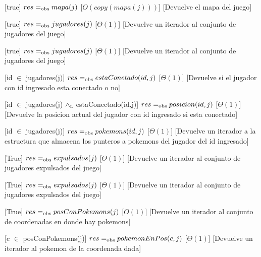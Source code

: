 \begin{Interfaz}
  [true]
  {$res =_{\mathrm{obs}} mapa(j)$}
  [$O(copy(mapa(j)))$]
  [Devuelve el mapa del juego]

  [true]
  {$res =_{\mathrm{obs}} jugadores(j)$}
  [$\Theta(1)$]
  [Devuelve un iterador al conjunto de jugadores del juego]

  [true]
  {$res =_{\mathrm{obs}} jugadores(j)$}
  [$\Theta(1)$]
  [Devuelve un iterador al conjunto de jugadores del juego]

  [id $\in$ jugadores(j)]
  {$res =_{\mathrm{obs}} estaConetado(id,j)$}
  [$\Theta(1)$]
  [Devuelve si el jugador con id ingresado esta conectado o no]

  [id $\in$ jugadores(j) $\land_{\mathrm{\scriptscriptstyle{L}}}$ estaConectado(id,j)]
  {$res =_{\mathrm{obs}} posicion(id,j)$}
  [$\Theta(1)$]
  [Devuelve la posicion actual del jugador con id ingresado si esta conectado]

  [id $\in$ jugadores(j)]
  {$res =_{\mathrm{obs}} pokemons(id,j)$}
  [$\Theta(1)$]
  [Devuelve un iterador a la estructura que almacena los punteros a pokemons del jugador del id ingresado]
  
  [True]
  {$res =_{\mathrm{obs}} expulsados(j)$}
  [$\Theta(1)$]
  [Devuelve un iterador al conjunto de jugadores expulsados del juego]

  [True]
  {$res =_{\mathrm{obs}} expulsados(j)$}
  [$\Theta(1)$]
  [Devuelve un iterador al conjunto de jugadores expulsados del juego]

  [True]
  {$res =_{\mathrm{obs}} posConPokemons(j)$}
  [$O(1)$]
  [Devuelve un iterador al conjunto de coordenadas en donde hay pokemons]

  [c $\in$ posConPokemons(j)]
  {$res =_{\mathrm{obs}} pokemonEnPos(c,j)$}
  [$\Theta(1)$] %
  [Devuelve un iterador al pokemon de la coordenada dada]


\end{Interfaz}
